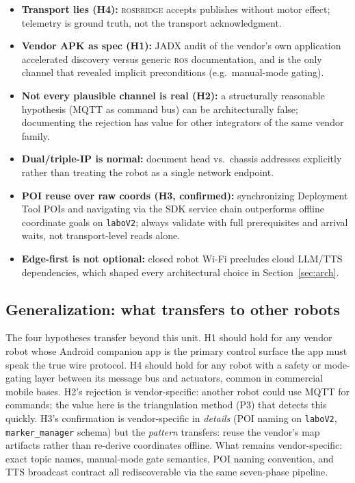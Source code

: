 \documentclass[conference]{IEEEtran}
\newcommand{\ros}{\textsc{ros}}
\newcommand{\rosbridge}{\textsc{rosbridge}}
\begin{document}
\begin{itemize}
\item \textbf{Transport lies (H4):} \rosbridge{} accepts publishes without motor effect; telemetry is ground truth, not the transport acknowledgment.
\item \textbf{Vendor APK as spec (H1):} JADX audit of the vendor's own application accelerated discovery versus generic \ros{} documentation, and is the only channel that revealed implicit preconditions (e.g.\ manual-mode gating).
\item \textbf{Not every plausible channel is real (H2):} a structurally reasonable hypothesis (MQTT as command bus) can be architecturally false; documenting the rejection has value for other integrators of the same vendor family.
\item \textbf{Dual/triple-IP is normal:} document head vs.\ chassis addresses explicitly rather than treating the robot as a single network endpoint.
\item \textbf{POI reuse over raw coords (H3, confirmed):} synchronizing Deployment Tool POIs and navigating via the SDK service chain outperforms offline coordinate goals on \texttt{laboV2}; always validate with full prerequisites and arrival waits, not transport-level reads alone.
\item \textbf{Edge-first is not optional:} closed robot Wi-Fi precludes cloud LLM/TTS dependencies, which shaped every architectural choice in Section~\ref{sec:arch}.
\end{itemize}

\subsection{Generalization: what transfers to other robots}

The four hypotheses transfer beyond this unit. H1 should hold for any vendor robot whose Android companion app is the primary control surface the app must speak the true wire protocol. 
H4 should hold for any robot with a safety or mode-gating layer between its message bus and actuators, common in commercial mobile bases. H2's rejection is vendor-specific: another robot could use MQTT for commands; the value here is the triangulation method (P3) that detects this quickly. 
H3's confirmation is vendor-specific in \emph{details} (POI naming on \texttt{laboV2}, \texttt{marker\_manager} schema) but the \emph{pattern} transfers: reuse the vendor's map artifacts rather than re-derive coordinates offline.
What remains vendor-specific: exact topic names, manual-mode gate semantics, POI naming convention, and TTS broadcast contract all rediscoverable via the same seven-phase pipeline.
\end{document}
